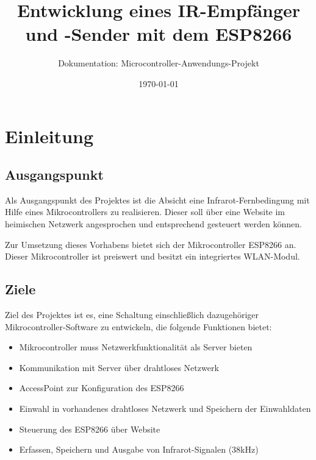 						




\title{Entwicklung eines IR-Empfänger und -Sender mit dem ESP8266}
\subtitle{Dokumentation: Microcontroller-Anwendungs-Projekt}
\author{} %
\date{\today}

\maketitle

\tableofcontents										%
\pagebreak

\section{Einleitung}
\subsection{Ausgangspunkt}
Als Ausgangspunkt des Projektes ist die Absicht eine Infrarot-Fernbedingung mit Hilfe eines Mikrocontrollers zu realisieren.
Dieser soll über eine Website im heimischen Netzwerk angesprochen und entsprechend gesteuert werden können.

Zur Umsetzung dieses Vorhabens bietet sich der Mikrocontroller ESP8266 an.
Dieser Mikrocontroller ist preiswert und besitzt ein integriertes WLAN-Modul.

\subsection{Ziele}
Ziel des Projektes ist es, eine Schaltung einschließlich dazugehöriger Mikrocontroller-Software zu entwickeln, die folgende Funktionen bietet:

\begin{itemize}
	\item Mikrocontroller muss Netzwerkfunktionalität als Server bieten
	\item Kommunikation mit Server über drahtloses Netzwerk
	\item AccessPoint zur Konfiguration des ESP8266
	\item Einwahl in vorhandenes drahtloses Netzwerk und Speichern der Einwahldaten
	\item Steuerung des ESP8266 über Website
	\item Erfassen, Speichern und Ausgabe von Infrarot-Signalen (38kHz)
\end{itemize}

